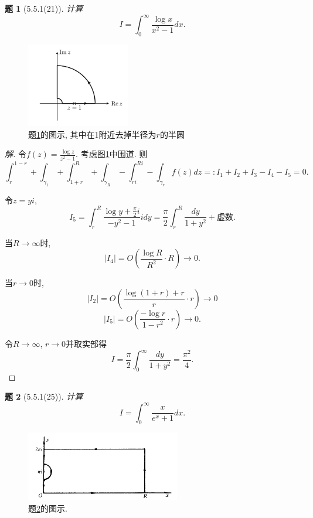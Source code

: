 \documentclass{article}[a4paper, 12pt]
\theoremstyle{mystyle}
\newtheorem{problem}{题}
\newenvironment{solution}{\begin{proof}[解]}{\end{proof}}
\begin{document}
\begin{problem}[5.5.1(21)]\label{21}
  计算\[I=\int_0^\infty \frac{\log x}{x^2-1}dx.\]
\end{problem}

\begin{figure}[htbp]
  \centering
  \includegraphics[width=0.4\textwidth]{images/21.png}
  \caption{题\ref{21}的图示, 其中在1附近去掉半径为\(r\)的半圆}
  \label{fig:21}
\end{figure}

\begin{solution}
  令\(f(z)=\frac{\log z}{z^2-1}\). 考虑图\ref{fig:21}中围道. 则\[\int_{r}^{1-r}+\int_{\gamma_1}+\int_{1+r}^R+\int_{\gamma_R}-\int_{ri}^{Ri}-\int_{\gamma_r} f(z)dz=:I_1+I_2+I_3-I_4-I_5=0.\]

  令\(z=yi\), \[I_5=\int_r^R\frac{\log y+\frac{\pi}{2}i}{-y^2-1}idy=\frac{\pi}{2}\int_r^R\frac{dy}{1+y^2}+\text{虚数}.\]

  当\(R\to\infty\)时, \[|I_4|=O\left(\frac{\log R}{R^2}\cdot R\right)\to0.\]

  当\(r\to0\)时, \[|I_2|=O\left(\frac{\log (1+r)+r}{r}\cdot r\right)\to0\] \[|I_5|=O\left(\frac{-\log r}{1-r^2}\cdot r\right)\to0.\]

  令\(R\to\infty\), \(r\to0\)并取实部得\[I=\frac{\pi}{2}\int_0^\infty\frac{dy}{1+y^2}=\frac{\pi^2}{4}.\tag*{\(\qed\)}\]
  \renewcommand{\qedsymbol}{}
\end{solution}

\begin{problem}[5.5.1(25)] \label{25}
  计算\[I=\int_0^\infty \frac{x}{e^x+1}dx.\]
\end{problem}

\begin{figure}[htbp]
  \centering
  \includegraphics[width=0.6\textwidth]{images/25.png}
  \caption{题\ref{25}的图示.}
  \label{fig:25}
\end{figure}
\end{document}
